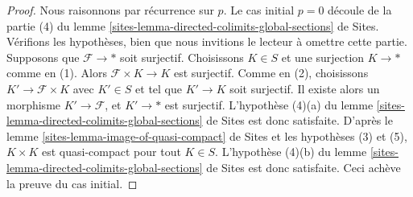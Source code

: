 \begin{proof}
Nous raisonnons par récurrence sur $p$. Le cas initial $p = 0$ découle de la
partie (4) du lemme \ref{sites-lemma-directed-colimits-global-sections} de
Sites. Vérifions les hypothèses, bien que nous invitions le lecteur à omettre
cette partie. Supposons que $\mathcal{F} \to *$ soit surjectif.
Choisissons $K \in S$ et une surjection $K \to *$ comme en (1). Alors
$\mathcal{F} \times K \to K$ est surjectif. Comme en (2), choisissons
$K' \to \mathcal{F} \times K$ avec $K' \in S$ et tel que $K' \to K$
soit surjectif.
Il existe alors un morphisme $K' \to \mathcal{F}$, et $K' \to *$ est
surjectif. L'hypothèse (4)(a) du lemme
\ref{sites-lemma-directed-colimits-global-sections} de Sites est donc
satisfaite. D'après le lemme \ref{sites-lemma-image-of-quasi-compact} de Sites
et les hypothèses (3) et (5), $K \times K$ est quasi-compact pour tout
$K \in S$. L'hypothèse (4)(b) du lemme
\ref{sites-lemma-directed-colimits-global-sections} de Sites est donc
satisfaite. Ceci achève la preuve du cas initial.


\end{proof}
